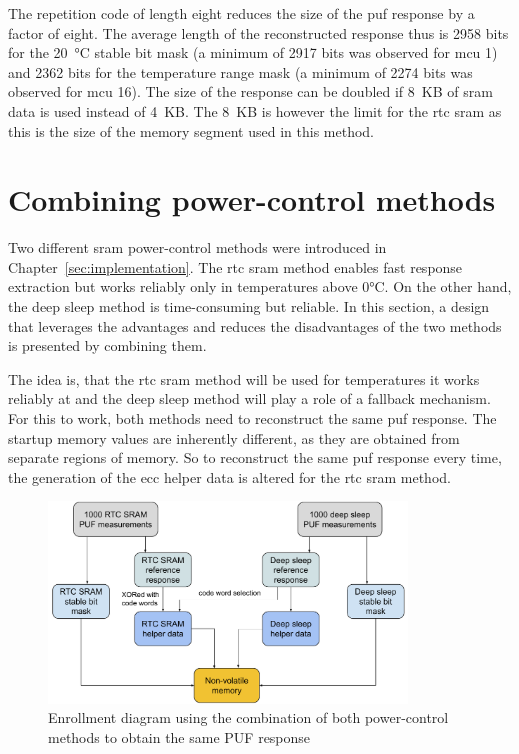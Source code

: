 The repetition code of length eight reduces the size of the \gls{puf} response by a factor of eight. The average length of the reconstructed response thus is 2958 bits for the 20~°C stable bit mask (a minimum of 2917 bits was observed for \gls{mcu} 1) and 2362 bits for the temperature range mask (a minimum of 2274 bits was observed for \gls{mcu} 16). The size of the response can be doubled if 8~KB of \gls{sram} data is used instead of 4~KB. The 8~KB is however the limit for the \gls{rtc} \gls{sram} as this is the size of the memory segment used in this method.

\section{Combining power-control methods}

Two different \gls{sram} power-control methods were introduced in Chapter~\ref{sec:implementation}. The \gls{rtc} \gls{sram} method enables fast response extraction but works reliably only in temperatures above 0°C. On the other hand, the deep sleep method is time-consuming but reliable. In this section, a design that leverages the advantages and reduces the disadvantages of the two methods is presented by combining them.

The idea is, that the \gls{rtc} \gls{sram} method will be used for temperatures it works reliably at and the deep sleep method will play a role of a fallback mechanism. For this to work, both methods need to reconstruct the same \gls{puf} response. The startup memory values are inherently different, as they are obtained from separate regions of memory. So to reconstruct the same \gls{puf} response every time, the generation of the \gls{ecc} helper data is altered for the \gls{rtc} \gls{sram} method.

\begin{figure}[ht!]
    \centering
    \captionsetup{justification=centering,margin=0.5cm}
    \includegraphics[width=0.85\textwidth]{images/enrollment_diagram.pdf}
    \caption{Enrollment diagram using the combination of both power-control methods to obtain the same PUF response}
    \label{fig:enrollment_diagram}
\end{figure}

